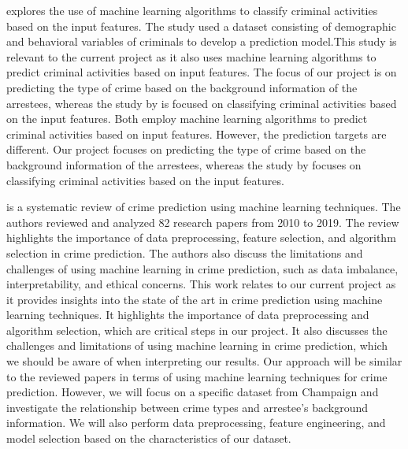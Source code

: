 \documentclass[
  article]{jss}
\begin{document}
\citet{Saeed2015} explores the use of machine learning algorithms to
classify criminal activities based on the input features. The study used
a dataset consisting of demographic and behavioral variables of
criminals to develop a prediction model.This study is relevant to the
current project as it also uses machine learning algorithms to predict
criminal activities based on input features. The focus of our project is
on predicting the type of crime based on the background information of
the arrestees, whereas the study by \citet{Saeed2015} is focused on
classifying criminal activities based on the input features. Both employ
machine learning algorithms to predict criminal activities based on
input features. However, the prediction targets are different. Our
project focuses on predicting the type of crime based on the background
information of the arrestees, whereas the study by \citet{Saeed2015}
focuses on classifying criminal activities based on the input features.

\citet{Mandalapu2023} is a systematic review of crime prediction using
machine learning techniques. The authors reviewed and analyzed 82
research papers from 2010 to 2019. The review highlights the importance
of data preprocessing, feature selection, and algorithm selection in
crime prediction. The authors also discuss the limitations and
challenges of using machine learning in crime prediction, such as data
imbalance, interpretability, and ethical concerns. This work relates to
our current project as it provides insights into the state of the art in
crime prediction using machine learning techniques. It highlights the
importance of data preprocessing and algorithm selection, which are
critical steps in our project. It also discusses the challenges and
limitations of using machine learning in crime prediction, which we
should be aware of when interpreting our results. Our approach will be
similar to the reviewed papers in terms of using machine learning
techniques for crime prediction. However, we will focus on a specific
dataset from Champaign and investigate the relationship between crime
types and arrestee's background information. We will also perform data
preprocessing, feature engineering, and model selection based on the
characteristics of our dataset.
\end{document}
